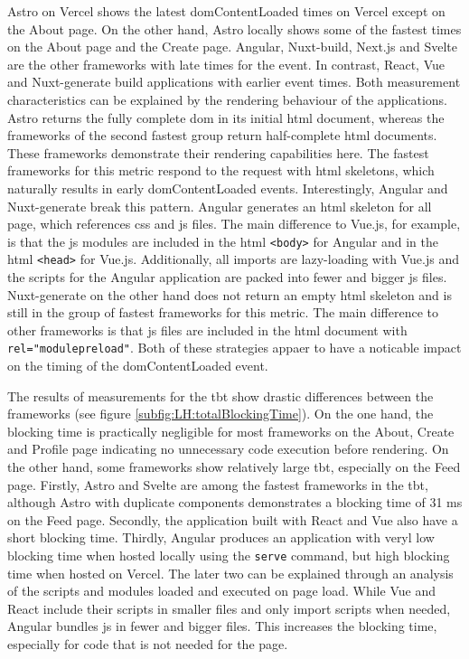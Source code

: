\documentclass[a4paper, 12pt]{article}
\begin{document}
Astro on Vercel shows the latest domContentLoaded times on Vercel except on the About page.
On the other hand, Astro locally shows some of the fastest times on the About page and the Create page.
Angular, Nuxt-build, Next.js and Svelte are the other frameworks with late times for the event.
In contrast, React, Vue and Nuxt-generate build applications with earlier event times.
Both measurement characteristics can be explained by the rendering behaviour of the applications.
Astro returns the fully complete \acrshort{dom} in its initial \acrshort{html} document, whereas the frameworks of the second fastest group return half-complete \acrshort{html} documents.
These frameworks demonstrate their rendering capabilities here.
The fastest frameworks for this metric respond to the request with \acrshort{html} skeletons, which naturally results in early domContentLoaded events.
Interestingly, Angular and Nuxt-generate break this pattern.
Angular generates an \acrshort{html} skeleton for all page, which references \acrshort{css} and \acrshort{js} files.
The main difference to Vue.js, for example, is that the \acrshort{js} modules are included in the \acrshort{html} \verb|<body>| for Angular and in the \acrshort{html} \verb|<head>| for Vue.js.
Additionally, all imports are lazy-loading with Vue.js and the scripts for the Angular application are packed into fewer and bigger \acrshort{js} files.
Nuxt-generate on the other hand does not return an empty \acrshort{html} skeleton and is still in the group of fastest frameworks for this metric.
The main difference to other frameworks is that \acrshort{js} files are included in the \acrshort{html} document with \verb|rel="modulepreload"|.
Both of these strategies appaer to have a noticable impact on the timing of the domContentLoaded event.

The results of measurements for the \acrlong{tbt} show drastic differences between the frameworks (see figure \ref{subfig:LH:totalBlockingTime}).
On the one hand, the blocking time is practically negligible for most frameworks on the About, Create and Profile page indicating no unnecessary code execution before rendering.
On the other hand, some frameworks show relatively large \acrshort{tbt}, especially on the Feed page.
Firstly, Astro and Svelte are among the fastest frameworks in the \acrshort{tbt}, although Astro with duplicate components demonstrates a blocking time of 31 ms on the Feed page.
Secondly, the application built with React and Vue also have a short blocking time.
Thirdly, Angular produces an application with veryl low blocking time when hosted locally using the \verb|serve| command, but high blocking time when hosted on Vercel.
The later two can be explained through an analysis of the scripts and modules loaded and executed on page load.
While Vue and React include their scripts in smaller files and only import scripts when needed, Angular bundles \acrlong{js} in fewer and bigger files.
This increases the blocking time, especially for code that is not needed for the page.
\end{document}
